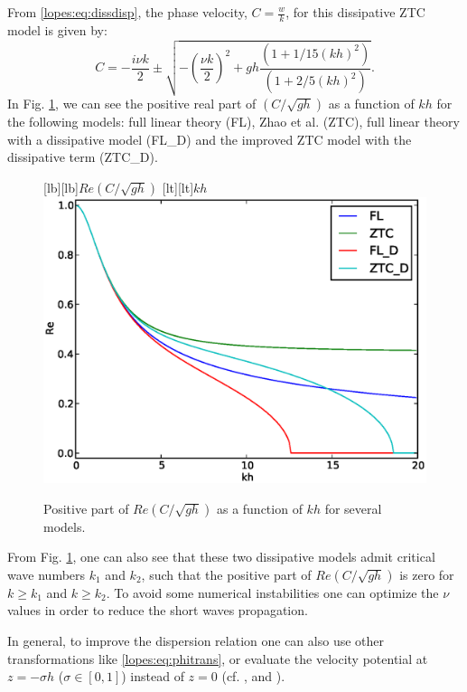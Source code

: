 From \eqref{lopes:eq:dissdisp}, the 
 phase velocity, \(\displaystyle C=\frac{w}{k}\),  for this dissipative ZTC model is 
 given by:
\begin{equation}
C=-\frac{i\nu k}{2}\pm\sqrt{-\left(\frac{\nu k}{2}\right)^2+gh\frac{(1+1/15(kh)^2)}{(1+2/5(kh)^2)}}.
\end{equation}
In Fig. \ref{lopes:fig:dispersion}, we can see the positive real
part 
of \(\displaystyle\left(C/\sqrt{gh}\right)\) as a function of \(kh\) for the following models:
  full linear theory (FL), 
Zhao et al. (ZTC), full linear theory with a 
dissipative model (FL\_D) and the
improved  ZTC model with the dissipative term (ZTC\_D).
  \begin{figure}[!htb]
{\centering 
{}[lb][lb]{$Re\left(C/\sqrt{gh}\right)$}
[lt][lt]{$kh$}
\includegraphics[width=\largewidth]{chapters/lopes/eps/dispersion.eps}
\caption{Positive  part of \(\displaystyle
Re\left(C/\sqrt{gh}\right)\) as a function of \(kh\) for several models.}
\label{lopes:fig:dispersion}\par}
\end{figure}
From Fig. \ref{lopes:fig:dispersion}, one can also see that
  these two dissipative models  admit
critical wave numbers \(k_1\) and \(k_2\), 
such that the positive  part of \(\displaystyle Re\left(C/\sqrt{gh}\right)\) is zero
for \(k\geq k_1\) and \(k\geq k_2\). 
To avoid some numerical instabilities one can optimize
 the \(\nu\) values in order 
 to reduce  the short waves propagation.
  

In general, to improve the dispersion relation one can also use other
 transformations like \eqref{lopes:eq:phitrans}, or evaluate the
 velocity potential at \(z=-\sigma h\) (\(\sigma\in[0,1]\))
 instead of  \(z=0\) (cf. \cite{BinghamMadsenEtAl2008}, \cite{MadsenAgnon2003} and \cite{MadsenBinghamEtAl2003}).  

